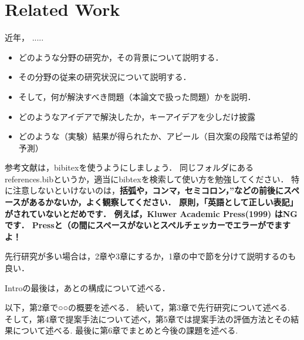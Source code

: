 \chapter{Related Work}
近年， .....


\begin{itemize}
 \setlength{\parskip}{0cm} %
 \setlength{\itemsep}{0cm} %
 \item どのような分野の研究か，その背景について説明する．
 \item その分野の従来の研究状況について説明する．
 \item そして，何が解決すべき問題（本論文で扱った問題）かを説明．
 \item どのようなアイデアで解決したか，キーアイデアを少しだけ披露
 \item どのような（実験）結果が得られたか、アピール（目次案の段階では希望的予測）
\end{itemize}

参考文献は，bibitexを使うようにしましょう\cite{栗原一貴2006プレゼン先生}．
同じフォルダにあるreferences.bibというか，適当にbibtexを検索して使い方を勉強してください．
特に注意しないといけないのは，{\bf 括弧や，コンマ，セミコロン，''などの前後にスペースがあるかないか，よく観察してください．
原則，「英語として正しい表記」がされていないとだめです．
例えば，Kluwer Academic Press(1999) はNGです．
Pressと（の間にスペースがないとスペルチェッカーでエラーがでますよ！}

 先行研究が多い場合は，2章や3章にするか，1章の中で節を分けて説明するのも良い．

 Introの最後は，あとの構成について述べる．

 以下，第2章で○○の概要を述べる．
 続いて，第3章で先行研究について述べる.
 そして，第4章で提案手法について述べ，第5章では提案手法の評価方法とその結果について述べる.
 最後に第6章でまとめと今後の課題を述べる.
